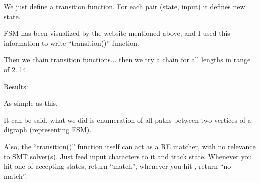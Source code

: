 We just define a transition function.
For each pair (state, input) it defines new state.

\ac{FSM} has been visualized by the website mentioned above, and I used this information to write ``transition()'' function.

Then we chain transition functions... then we try a chain for all lengths in range of 2..14.



Results:



As simple as this.

It can be said, what we did is enumeration of all paths between two vertices of a digraph (representing \ac{FSM}).

Also, the ``transition()'' function itself can act as a RE matcher, with no relevance to SMT solver(s).
Just feed input characters to it and track state.
Whenever you hit one of accepting states, return ``match'', whenever you hit , return ``no match''.

